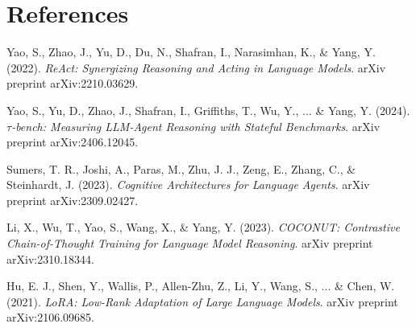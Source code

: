 \documentclass[11pt]{article}
\begin{document}
\section{References}

\begin{thebibliography}{9}

Yao, S., Zhao, J., Yu, D., Du, N., Shafran, I., Narasimhan, K., \& Yang, Y. (2022).
\textit{ReAct: Synergizing Reasoning and Acting in Language Models}.
arXiv preprint arXiv:2210.03629.

Yao, S., Yu, D., Zhao, J., Shafran, I., Griffiths, T., Wu, Y., ... \& Yang, Y. (2024).
\textit{$\tau$-bench: Measuring LLM-Agent Reasoning with Stateful Benchmarks}.
arXiv preprint arXiv:2406.12045.

Sumers, T. R., Joshi, A., Paras, M., Zhu, J. J., Zeng, E., Zhang, C., \& Steinhardt, J. (2023).
\textit{Cognitive Architectures for Language Agents}.
arXiv preprint arXiv:2309.02427.

Li, X., Wu, T., Yao, S., Wang, X., \& Yang, Y. (2023).
\textit{COCONUT: Contrastive Chain-of-Thought Training for Language Model Reasoning}.
arXiv preprint arXiv:2310.18344.

Hu, E. J., Shen, Y., Wallis, P., Allen-Zhu, Z., Li, Y., Wang, S., ... \& Chen, W. (2021).
\textit{LoRA: Low-Rank Adaptation of Large Language Models}.
arXiv preprint arXiv:2106.09685.

\end{thebibliography}

\hypersetup{
    linkcolor=blue,
    citecolor=red,
    urlcolor=magenta
}
\end{document}
